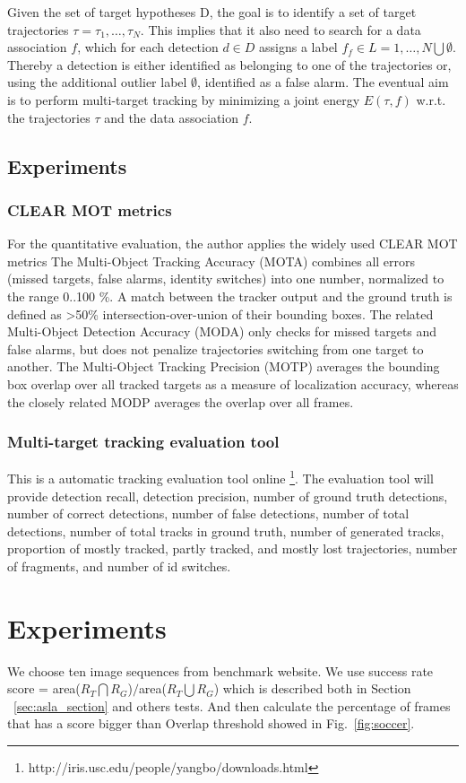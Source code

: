 \documentclass{article}
\begin{document}
Given the set of target hypotheses D, the goal is to identify a set of target trajectories $\tau = {\tau_1,\ldots,\tau_N}$. This implies that it also need to search for a data association $f$, which for each detection $d \in D$ assigns a label $f_f \in L = {1,\ldots,N}\bigcup \emptyset$. Thereby a detection is either identified as belonging to one of the trajectories or, using the additional outlier label $\emptyset$, identified as a false alarm.
The eventual aim is to perform multi-target tracking by minimizing a joint energy $E(\tau , f)$ w.r.t. the trajectories $\tau$ and the data association $f$. 

\subsection{Experiments}
\subsubsection{CLEAR MOT metrics}
For the quantitative evaluation, the author applies the widely used CLEAR MOT metrics The Multi-Object Tracking Accuracy (MOTA) combines all errors (missed targets, false alarms, identity switches) into one number, normalized to the range 0..100 \%. A match between the tracker output and the ground truth is defined as >50\% intersection-over-union of their bounding boxes. The related Multi-Object Detection Accuracy (MODA) only checks for missed targets and false alarms, but does not penalize trajectories switching from one target to another. The Multi-Object Tracking Precision (MOTP) averages the bounding box overlap over all tracked targets as a measure of localization accuracy, whereas the closely related MODP averages the overlap over all frames.
\subsubsection{Multi-target tracking evaluation tool}
This is a automatic tracking evaluation tool online \footnote{http://iris.usc.edu/people/yangbo/downloads.html}. The evaluation tool will provide detection recall, detection precision, number of ground truth detections, number of correct detections, number of false detections, number of total detections, number of total tracks in ground truth, number of generated tracks, proportion of mostly tracked, partly tracked, and mostly lost trajectories, number of fragments, and number of id switches.

\section{Experiments}
We choose ten image sequences from benchmark website\cite{dataset}. We use success rate score = area($R_T \bigcap R_G$)$/$area($R_T \bigcup R_G$) which is described both in Section ~\ref{sec:asla_section} and others tests\cite{benchmark}. And then calculate the percentage of frames that has a score bigger than Overlap threshold showed in Fig.~\ref{fig:soccer}.
\end{document}
